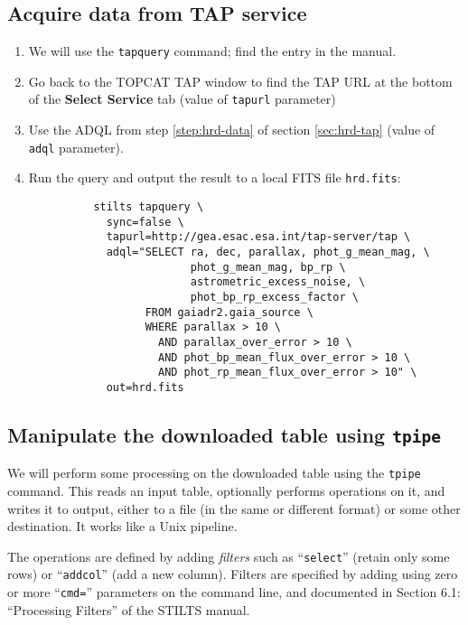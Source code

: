\documentclass{article}
\newcommand{\lab}[1]{{\bf #1}}
\begin{document}
\subsection{Acquire data from TAP service}

\begin{enumerate}
\item We will use the {\tt tapquery} command;
      find the entry in the manual.
\item Go back to the TOPCAT TAP window to find the TAP URL at the
      bottom of the \lab{Select Service} tab (value of {\tt tapurl} parameter)
\item Use the ADQL from step \ref{step:hrd-data} of section \ref{sec:hrd-tap}
      (value of {\tt adql} parameter).
\item Run the query and output the result to a local FITS file {\tt hrd.fits}:
      \begin{verbatim}
          stilts tapquery \
            sync=false \
            tapurl=http://gea.esac.esa.int/tap-server/tap \
            adql="SELECT ra, dec, parallax, phot_g_mean_mag, \
                         phot_g_mean_mag, bp_rp \
                         astrometric_excess_noise, \
                         phot_bp_rp_excess_factor \
                  FROM gaiadr2.gaia_source \
                  WHERE parallax > 10 \
                    AND parallax_over_error > 10 \
                    AND phot_bp_mean_flux_over_error > 10 \
                    AND phot_rp_mean_flux_over_error > 10" \
            out=hrd.fits
      \end{verbatim}
\end{enumerate}

\subsection{Manipulate the downloaded table using {\tt tpipe}}

We will perform some processing on the downloaded table using
the {\tt tpipe} command.
This reads an input table, optionally performs operations on it,
and writes it to output, either to a file (in the same or different format)
or some other destination.  It works like a Unix pipeline.

The operations are defined by adding {\em filters} such as
``{\tt select}'' (retain only some rows) or ``{\tt addcol}''
(add a new column).  Filters are specified by adding using zero
or more ``{\tt cmd=}'' parameters on the command line,
and documented in Section 6.1: ``Processing Filters'' of the STILTS manual.
\end{document}
